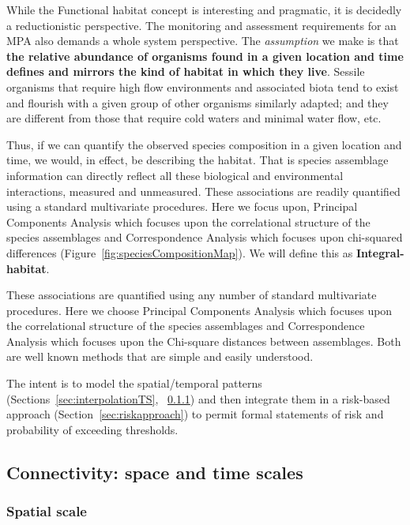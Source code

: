 \documentclass[letterpaper,portrait,11pt]{scrartcl}
\numberwithin{equation}{section}		%
\numberwithin{figure}{section}		%
\numberwithin{table}{section}				%
\begin{document}
While the Functional habitat concept is interesting and pragmatic, it is decidedly a reductionistic perspective. The monitoring and assessment requirements for an MPA also demands a whole system perspective. The \textit{assumption} we make is that \textbf{the relative abundance of organisms found in a given location and time defines and mirrors the kind of habitat in which they live}. Sessile organisms that require high flow environments and associated biota tend to exist and flourish with a given group of other organisms similarly adapted; and they are different from those that require cold waters and minimal water flow, etc. 

Thus, if we can quantify the observed species composition in a given location and time, we would, in effect, be describing the habitat. That is species assemblage information can directly reflect all these biological and environmental interactions, measured and unmeasured. These associations are readily quantified using a standard multivariate procedures. Here we focus upon, Principal Components Analysis which focuses upon the correlational structure of the species assemblages and Correspondence Analysis which focuses upon chi-squared differences (Figure~\ref{fig:speciesCompositionMap}). We will define this as \textbf{Integral-habitat}. 

These associations are quantified using any number of standard multivariate procedures. Here we choose Principal Components Analysis which focuses upon the correlational structure of the species assemblages and Correspondence Analysis which focuses upon the Chi-square distances between assemblages. Both are well known methods that are simple and easily understood. 

The intent is to model the spatial/temporal patterns (Sections~\ref{sec:interpolationTS}, ~\ref{sec:interpolationSpatial}) and then integrate them in a risk-based approach (Section~\ref{sec:riskapproach}) to permit formal statements of risk and probability of exceeding thresholds. 


\subsection{Connectivity: space and time scales}

\subsubsection{Spatial scale}
\label{sec:interpolationSpatial}
\end{document}
